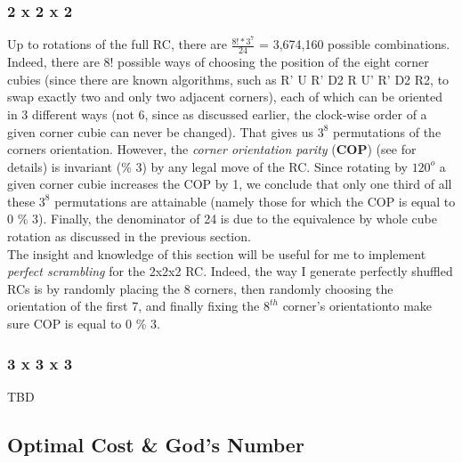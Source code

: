 \subsubsection{2 x 2 x 2}

Up to rotations of the full RC, there are $\frac{8! * 3^{7}}{24}$ = 3,674,160 possible combinations. Indeed, there are 8! possible ways of choosing the position of the eight corner cubies (since there are known algorithms, such as R’ U R’ D2 R U’ R’ D2 R2, to swap exactly two and only two adjacent corners), each of which can be oriented in 3 different ways (not 6, since as discussed earlier, the clock-wise order of a given corner cubie can never be changed). That gives us $3^8$ permutations of the corners orientation. However, the \textit{corner orientation parity} (\textbf{COP}) (see \cite{Schoenert} for details) is invariant (\% 3) by any legal move of the RC. Since rotating by $120^{o}$ a given corner cubie increases the COP by 1, we conclude that only one third of all these $3^8$ permutations are attainable (namely those for which the COP is equal to 0 \% 3). Finally, the denominator of 24 is due to the equivalence by whole cube rotation as discussed in the previous section.
\\
The insight and knowledge of this section will be useful for me to implement \textit{perfect scrambling} for the 2x2x2 RC. Indeed, the way I generate perfectly shuffled RCs is by randomly placing the 8 corners, then randomly choosing the orientation of the first 7, and finally fixing the $8^{th}$ corner's orientationto make sure COP is equal to 0 \% 3.


\subsubsection{3 x 3 x 3}

TBD

\subsection{Optimal Cost \& God's Number}



\cite{RubiksChicago}
\\
\cite{RubiksRadu}
\\



